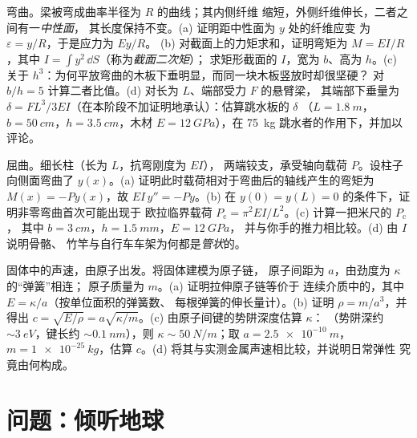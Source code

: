 \begin{exercise}[$\star\star\star$]\label{exo:b3:continuum-elasticity:10}
弯曲。梁被弯成曲率半径为 $R$ 的曲线；其内侧纤维
缩短，外侧纤维伸长，二者之间有一\emph{中性面}，
其长度保持不变。(a) 证明距中性面为 $y$ 处的纤维应变
为 $\varepsilon = y/R$，于是应力为 $Ey/R$。
(b) 对截面上的力矩求和，证明弯矩为
$M = EI/R$，其中 $I = \int y^2\,\dd S$（称为\emph{截面二次矩}）；
求矩形截面的 $I$，宽为 $b$、高为 $h$。(c) 关于
$h^3$：为何平放弯曲的木板下垂明显，而同一块木板竖放时却很坚硬？
对 $b/h = 5$ 计算二者比值。(d) 对长为 $L$、端部受力 $F$ 的悬臂梁，
其端部下垂量为
$\delta = FL^3/3EI$（在本阶段不加证明地承认）：估算跳水板的 $\delta$
（$L = \qty{1.8}{m}$，$b = \qty{50}{cm}$，$h = \qty{3.5}{cm}$，木材 $E
= \qty{12}{GPa}$），在 \qty{75}{kg} 跳水者的作用下，并加以评论。
\end{exercise}

\begin{exercise}[$\star\star\star$]\label{exo:b3:continuum-elasticity:11}
屈曲。细长柱（长为 $L$，抗弯刚度为 $EI$），
两端铰支，承受轴向载荷 $P$。设柱子向侧面弯曲了
$y(x)$。(a) 证明此时载荷相对于弯曲后的轴线产生的弯矩为
$M(x) = -Py(x)$，故 $EI\,y'' = -Py$。(b)
在 $y(0) = y(L) = 0$ 的条件下，证明非零弯曲首次可能出现于
欧拉临界载荷
$P_{\text{c}} = \pi^2EI/L^2$。(c) 计算一把米尺的 $P_{\text{c}}$，
其中 $b = \qty{3}{cm}$，$h = \qty{1.5}{mm}$，$E = \qty{12}{GPa}$，
并与你手的推力相比较。(d) 由 $I$ 说明骨骼、
竹竿与自行车车架为何都是\emph{管状}的。
\end{exercise}

\begin{exercise}[$\star\star\star$]\label{exo:b3:continuum-elasticity:12}
固体中的声速，由原子出发。将固体建模为原子链，
原子间距为 $a$，由劲度为 $\kappa$ 的“弹簧”相连；
原子质量为 $m$。(a) 证明拉伸原子链等价于
连续介质中的，其中 $E = \kappa/a$（按单位面积的弹簧数、
每根弹簧的伸长量计）。(b) 证明 $\rho = m/a^3$，并得出 $c =
\sqrt{E/\rho} = a\sqrt{\kappa/m}$。(c) 由原子间键的势阱深度估算 $\kappa$：
（势阱深约 $\sim\qty{3}{eV}$，键长约 $\sim
\qty{0.1}{nm}$），则 $\kappa \sim \qty{50}{N/m}$；取 $a =
\qty{2.5e-10}{m}$，$m = \qty{1e-25}{kg}$，估算 $c$。(d)
将其与实测金属声速相比较，并说明日常弹性
究竟由何构成。
\end{exercise}

\section{问题：倾听地球}

